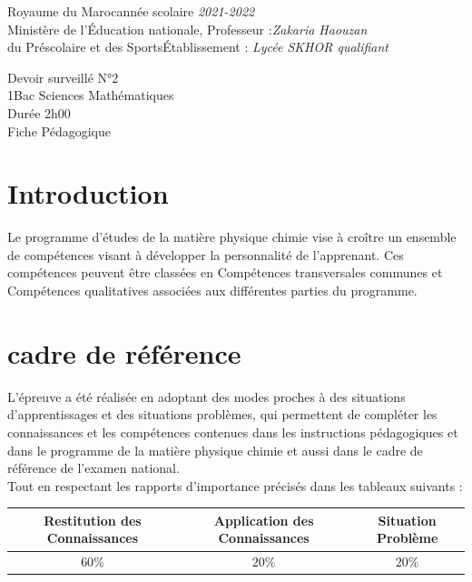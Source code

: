 \documentclass[12pt]{article}
\newcommand\headerMe[2]{\noindent{}#1\hfill#2}
\begin{document}
\headerMe{Royaume du Maroc}{année scolaire \emph{2021-2022}}\\
\headerMe{Ministère de l'Éducation nationale, }{  Professeur :\emph{Zakaria Haouzan}}\\
\headerMe{du Préscolaire et des Sports}{Établissement : \emph{Lycée SKHOR qualifiant}}\\

\begin{center}
Devoir surveillé N°2 \\
1Bac Sciences Mathématiques\\
Durée 2h00
\\
    \vspace{.2cm}
\hrulefill
\Large{Fiche Pédagogique}
\hrulefill\\
\end{center}


\section[A]{Introduction }
\hspace{0.5cm}Le programme d'études de la matière physique chimie vise à croître un ensemble de compétences visant à développer la personnalité de l'apprenant. Ces compétences peuvent être classées en Compétences transversales communes et Compétences qualitatives associées aux différentes parties du programme.
\section{cadre de référence }
 \hspace{0.5cm}L'épreuve a été réalisée en adoptant des modes proches à des situations d'apprentissages et des situations problèmes, qui permettent de compléter les connaissances et les compétences contenues dans les instructions pédagogiques et dans le programme de la matière physique chimie et aussi dans le cadre de référence de l'examen national. 
 \\Tout en respectant les rapports d'importance précisés dans les tableaux suivants :
 \begin{center}
\begin{tabular}{|c||c||c|}
\hline
    \textbf{Restitution des Connaissances} & \textbf{Application des Connaissances} & \textbf{Situation Problème }\\
    \hline
    $60\%$ & $20\%$ & $20\%$\\
    \hline
\end{tabular} 
\end{center}
\end{document}
